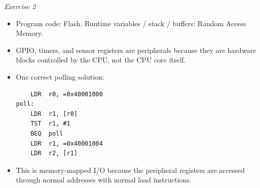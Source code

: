 \documentclass[11pt,a4paper]{article}
\begin{document}
\textit{Exercise 2}
\begin{itemize}[leftmargin=1.5em]
\item Program code: Flash. Runtime variables / stack / buffers: Random Access Memory.
\item GPIO, timers, and sensor registers are peripherals because they are hardware blocks controlled by the CPU, not the CPU core itself.
\item One correct polling solution:
\begin{verbatim}
    LDR  r0, =0x40001000
poll:
    LDR  r1, [r0]
    TST  r1, #1
    BEQ  poll
    LDR  r1, =0x40001004
    LDR  r2, [r1]
\end{verbatim}
\item This is memory-mapped I/O because the peripheral registers are accessed through normal addresses with normal load instructions.
\end{itemize}
\end{document}
